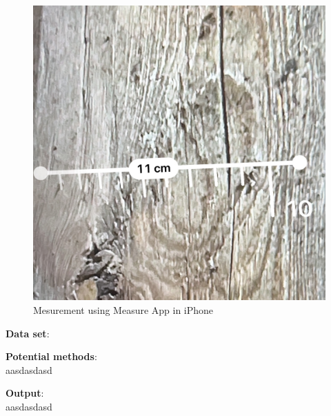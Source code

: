 \begin{figure}[ht]
  \centering
   \includegraphics[width=.5\textwidth]{Master Thesis/Images/Section_3/3_iphone_measure.jpg}
  \caption{Mesurement using Measure App in iPhone}   
  \label{fig:iphone_mea}
\end{figure}  


\hspace*{\fill}

\textbf{Data set}:\\



\hspace*{\fill}

\textbf{Potential methods}:\\

aasdasdasd


\hspace*{\fill}

\textbf{Output}:\\

aasdasdasd

